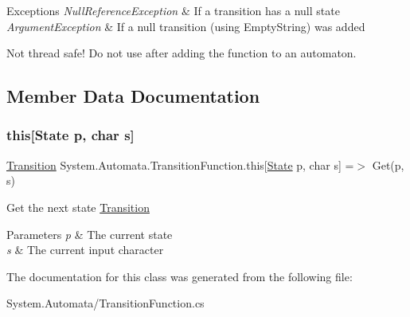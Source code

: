 \begin{DoxyExceptions}{Exceptions}
{\em Null\+Reference\+Exception} & If a transition has a null state\\
\hline
{\em Argument\+Exception} & If a null transition (using Empty\+String) was added\\
\hline
\end{DoxyExceptions}


Not thread safe! Do not use after adding the function to an automaton.

\subsection{Member Data Documentation}
\mbox{\label{class_system_1_1_automata_1_1_transition_function_a887174305e7741235859aceff5556bbd}} 
\subsubsection{\texorpdfstring{this[State p, char s]}{this[State p, char s]}}
{\footnotesize\ttfamily \mbox{\hyperlink{class_system_1_1_automata_1_1_transition}{Transition}} System.\+Automata.\+Transition\+Function.\+this\mbox{[}\mbox{\hyperlink{class_system_1_1_automata_1_1_state}{State}} p, char s\mbox{]} =$>$ Get(p, s)}



Get the next state \mbox{\hyperlink{class_system_1_1_automata_1_1_transition}{Transition}} 


\begin{DoxyParams}{Parameters}
{\em p} & The current state\\
\hline
{\em s} & The current input character\\
\hline
\end{DoxyParams}


The documentation for this class was generated from the following file\+:\begin{DoxyCompactItemize}
\item 
System.\+Automata/Transition\+Function.\+cs\end{DoxyCompactItemize}
